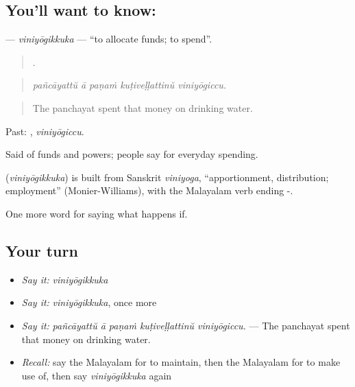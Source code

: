 \subsection*{You'll want to know: }
\textbf{} — \emph{viniyōgikkuka} — \textquotedblleft{}to allocate funds; to spend\textquotedblright{}.

\begin{quote}
    .
\end{quote}

\begin{quote}
\emph{pañcāyattŭ ā paṇaṁ kuṭiveḷḷattinŭ viniyōgiccu.}
\end{quote}

\begin{quote}
The panchayat spent that money on drinking water.
\end{quote}

Past: , \emph{viniyōgiccu}.

Said of funds and powers; people say  for everyday spending.

\begin{cousinweb}
\textbf{} (\emph{viniyōgikkuka}) is built from Sanskrit \emph{viniyoga}, \textquotedblleft{}apportionment, distribution; employment\textquotedblright{} (Monier-Williams), with the Malayalam verb ending -.
\end{cousinweb}

\begin{grammarlens}[title={What you've built}]
One more word for saying what happens if.
\end{grammarlens}

\subsection*{Your turn}
\begin{itemize}
\raggedright
  \item \emph{Say it:} \emph{viniyōgikkuka}
  \item \emph{Say it:} \emph{viniyōgikkuka}, once more
  \item \emph{Say it:} \emph{pañcāyattŭ ā paṇaṁ kuṭiveḷḷattinŭ viniyōgiccu.} — The panchayat spent that money on drinking water.
  \item \emph{Recall:} say the Malayalam for to maintain, then the Malayalam for to make use of, then say \emph{viniyōgikkuka} again
\end{itemize}


